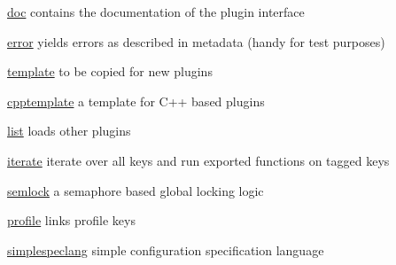 \begin{DoxyItemize}
\item \hyperlink{md_src_plugins_doc_README_src_plugins_doc_README_md}{doc} contains the documentation of the plugin interface
\item \hyperlink{md_src_plugins_error_README_src_plugins_error_README_md}{error} yields errors as described in metadata (handy for test purposes)
\item \hyperlink{md_src_plugins_template_README_src_plugins_template_README_md}{template} to be copied for new plugins
\item \hyperlink{md_src_plugins_cpptemplate_README_src_plugins_cpptemplate_README_md}{cpptemplate} a template for C++ based plugins
\item \hyperlink{md_src_plugins_list_README_src_plugins_list_README_md}{list} loads other plugins
\item \hyperlink{md_src_plugins_iterate_README_src_plugins_iterate_README_md}{iterate} iterate over all keys and run exported functions on tagged keys
\item \hyperlink{md_src_plugins_semlock_README_src_plugins_semlock_README_md}{semlock} a semaphore based global locking logic
\item \hyperlink{md_src_plugins_profile_README_src_plugins_profile_README_md}{profile} links profile keys
\item \hyperlink{md_src_plugins_simplespeclang_README_src_plugins_simplespeclang_README_md}{simplespeclang} simple configuration specification language 
\end{DoxyItemize}